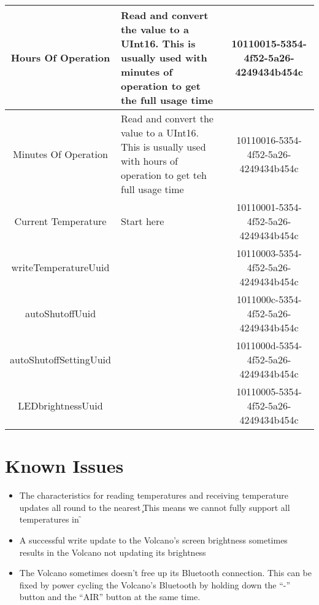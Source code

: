\begin{longtable}{c|p{2.1in}|c}
Hours Of Operation&Read and convert the value to a UInt16.  This is usually used with minutes of operation to get the full usage time&10110015-5354-4f52-5a26-4249434b454c\\ \hline
Minutes Of Operation&Read and convert the value to a UInt16.  This is usually used with hours of operation to get teh full usage time &10110016-5354-4f52-5a26-4249434b454c\\ \hline
Current Temperature&Start here&10110001-5354-4f52-5a26-4249434b454c\\ \hline
writeTemperatureUuid&&10110003-5354-4f52-5a26-4249434b454c\\ \hline
autoShutoffUuid&&1011000c-5354-4f52-5a26-4249434b454c\\ \hline
autoShutoffSettingUuid&&1011000d-5354-4f52-5a26-4249434b454c\\ \hline
LEDbrightnessUuid&&10110005-5354-4f52-5a26-4249434b454c\\ \hline
\end{longtable}
\section{Known Issues}
\begin{itemize}
    \item The characteristics for reading temperatures and receiving temperature updates all round to the nearest \c
        \subitem This means we cannot fully support all temperatures in \f
    \item A successful write update to the Volcano's screen brightness sometimes results in the Volcano not updating its brightness
    \item The Volcano sometimes doesn't free up its Bluetooth connection. This can be fixed by power cycling the Volcano's Bluetooth by holding down the ``-'' button and the ``AIR'' button at the same time.
\end{itemize}


